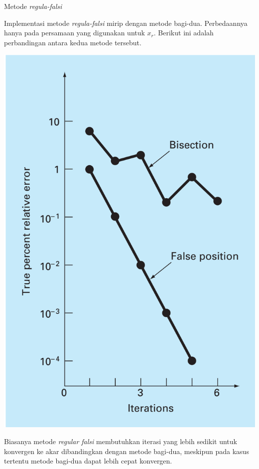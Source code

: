\begin{frame}{Metode \textit{regula-falsi}}
\fontsize{9}{10}\selectfont

Implementasi metode \textit{regula-falsi} mirip dengan metode bagi-dua.
Perbedaannya hanya pada persamaan yang digunakan untuk $x_r$.
Berikut ini adalah perbandingan antara kedua metode tersebut.

{\centering
\includegraphics[height=0.5\textheight]{../chapra_7th/Chapra_Fig_5_13.png}
\par}

Biasanya metode \textit{regular falsi} membutuhkan iterasi yang lebih sedikit
untuk konvergen ke akar dibandingkan dengan metode bagi-dua, meskipun pada kasus
tertentu metode bagi-dua dapat lebih cepat konvergen.

\end{frame}




